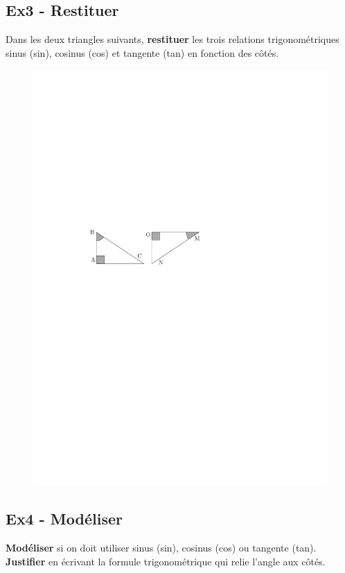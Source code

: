 \documentclass[12pt]{article}
\begin{document}
\subsection*{Ex3 - Restituer}

\begin{multicols}{2}

  Dans les deux triangles suivants, \textbf{restituer} les trois relations trigonométriques sinus (sin), cosinus (cos) et tangente (tan) en fonction des côtés.

  \begin{figure}[H]
    \centering
    \includegraphics[width=0.6 \linewidth]{4x2-trigonometrie/sources/trigo-ex3b.pdf}
  \end{figure}
\end{multicols}

\subsection*{Ex4 - Modéliser}

\textbf{Modéliser} si on doit utiliser sinus (sin), cosinus (cos) ou tangente (tan). \textbf{Justifier} en écrivant la formule trigonométrique qui relie l'angle aux côtés.
\end{document}

